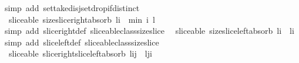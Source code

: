 \begin{isabellebody}
\isamarkupfalse%
\ {\isacharparenleft}simp\ add{\isacharcolon}\ set{\isacharunderscore}take{\isacharunderscore}disj{\isacharunderscore}set{\isacharunderscore}drop{\isacharunderscore}if{\isacharunderscore}distinct\ {\isacharparenright}%
\endisatagproof
{\isafoldproof}%
%
\isadelimproof
\isanewline
%
\endisadelimproof
\isanewline
{}\isamarkupfalse%
\ {\isacharparenleft}\ sliceable{\isacharparenright}\ size{\isacharunderscore}slice{\isacharunderscore}right{\isacharunderscore}absorb{\isacharcolon}\ {\isachardoublequoteopen}{\isacharparenleft}{\isacharhash}{\isacharparenleft}l{\isasymdagger}{\isachardot}{\isachardot}i{\isacharparenright}{\isacharparenright}\ {\isacharequal}\ min\ i\ {\isacharparenleft}{\isacharhash}l{\isacharparenright}{\isachardoublequoteclose}\isanewline
%
\isadelimproof
%
\endisadelimproof
%
\isatagproof
{}\isamarkupfalse%
\ {\isacharparenleft}simp\ add{\isacharcolon}\ slice{\isacharunderscore}right{\isacharunderscore}def\ sliceable{\isacharunderscore}class{\isachardot}size{\isacharunderscore}slice{\isacharparenright}%
\endisatagproof
{\isafoldproof}%
%
\isadelimproof
\isanewline
%
\endisadelimproof
\isanewline
{}\isamarkupfalse%
\ {\isacharparenleft}\ sliceable{\isacharparenright}\ size{\isacharunderscore}slice{\isacharunderscore}left{\isacharunderscore}absorb{\isacharcolon}\ {\isachardoublequoteopen}{\isacharparenleft}{\isacharhash}{\isacharparenleft}l{\isasymdagger}i{\isachardot}{\isachardot}{\isacharparenright}{\isacharparenright}\ {\isacharequal}\ {\isacharparenleft}{\isacharhash}l{\isacharparenright}{\isacharminus}i{\isachardoublequoteclose}\isanewline
%
\isadelimproof
%
\endisadelimproof
%
\isatagproof
{}\isamarkupfalse%
\ {\isacharparenleft}simp\ add{\isacharcolon}\ slice{\isacharunderscore}left{\isacharunderscore}def\ sliceable{\isacharunderscore}class{\isachardot}size{\isacharunderscore}slice{\isacharparenright}%
\endisatagproof
{\isafoldproof}%
%
\isadelimproof
\isanewline
%
\endisadelimproof
\isanewline
{}\isamarkupfalse%
\ {\isacharparenleft}\ sliceable{\isacharparenright}\ slice{\isacharunderscore}right{\isacharunderscore}slice{\isacharunderscore}left{\isacharunderscore}absorb{\isacharcolon}\ {\isachardoublequoteopen}{\isacharparenleft}l{\isasymdagger}{\isachardot}{\isachardot}i{\isacharparenright}{\isasymdagger}j{\isachardot}{\isachardot}\ {\isacharequal}\ l{\isasymdagger}j{\isachardot}{\isachardot}i{\isachardoublequoteclose}\isanewline
%
\isadelimproof
%
\endisadelimproof
%
\isatagproof
{}\isamarkupfalse%

\end{isabellebody}
